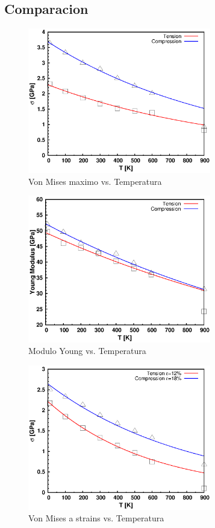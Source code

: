 \documentclass[10pt, oneside]{article} %
\begin{document}
%
%

\subsection{Comparacion}

\begin{figure}[H]
\centering
\includegraphics[width=8cm]{Figures/peakstress_T_BOTH.eps}
\caption{Von Mises maximo vs. Temperatura}
\end{figure}

\begin{figure}[H]
\centering
\includegraphics[width=8cm]{Figures/young_T_both.eps}
\caption{Modulo Young vs. Temperatura}
\end{figure}

\begin{figure}[H]
\centering
\includegraphics[width=8cm]{Figures/defstress_T_BOTH.eps}
\caption{Von Mises a strains vs. Temperatura}
\end{figure}
\end{document}
